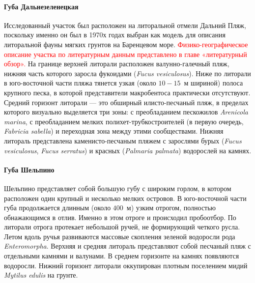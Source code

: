     \paragraph{Губа Дальнезеленецкая}
Исследованный   участок   был   расположен   на   литоральной   отмели   Дальний   Пляж, поскольку именно он был в 1970х годах выбран как модель для описания литоральной фауны мягких   грунтов   на   Баренцевом   море.   
\textcolor{red}{Физико-географическое   описание   участка   по литературным данным представлено в главе «литературный обзор».}
На   границе   верхней   литорали   расположен   валунно-галечный   пляж,  нижняя   часть которого заросла фукоидами ({\it Fucus vesiculosus}). 
Ниже по литорали в юго-восточной части пляжа   тянется   узкая   (около   $10-15$~м   шириной)   полоса   крупного   песка,   в   которой представители макробентоса практически отсутствуют.
Средний   горизонт   литорали --- это   обширный   илисто-песчаный   пляж,   в  пределах которого визуально выделяется три зоны: с преобладанием пескожилов  {\it Arenicola marina}, с преобладанием   мелких   полихет-трубкостроителей   (в   первую   очередь, {\it Fabricia   sabella})   и переходная   зона   между   этими   сообществами.   
Нижняя   литораль   представлена   каменисто-песчаным пляжем с зарослями бурых ({\it Fucus vesiculosus}, {\it Fucus serratus}) и красных ({\it Palmaria  palmata}) водорослей на камнях.

    \paragraph{Губа Шельпино}
Шельпино   представляет   собой   большую   губу   с   широким   горлом,   в   котором расположен   один   крупный   и   несколько   мелких   островов.   
В   юго-восточной   части   губа продолжается   длинным   (около   $400$~м)   узким   отрогом,   полностью   обнажающимся   в   отлив. 
Именно в этом отроге и происходил пробоотбор. 
По   литорали   отрога   протекает   небольшой   ручей,   не   формирующий   четкого   русла. 
Летом вдоль ручья развиваются массовые скопления зеленой водоросли рода  {\it Enteromorpha}. 
Верхняя и средняя литораль представляют собой песчаный пляж с отдельными камнями и валунами. 
В среднем горизонте на камнях появляются водоросли. 
Нижний горизонт литорали оккупирован плотным поселением мидий {\it Mytilus edulis} на грунте.

